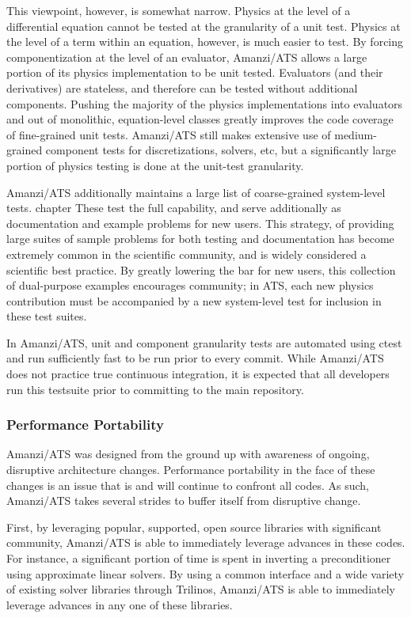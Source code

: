 This viewpoint, however, is somewhat narrow.  Physics at the level of
a differential equation cannot be tested at the granularity of a unit
test.  Physics at the level of a term within an equation, however, is
much easier to test.  By forcing componentization at the level of an
evaluator, Amanzi/ATS allows a large portion of its physics
implementation to be unit tested.  Evaluators (and their derivatives)
are stateless, and therefore can be tested without additional
components.  Pushing the majority of the physics implementations into
evaluators and out of monolithic, equation-level classes greatly
improves the code coverage of fine-grained unit tests.  Amanzi/ATS
still makes extensive use of medium-grained component tests for
discretizations, solvers, etc, but a significantly large portion of
physics testing is done at the unit-test granularity.

Amanzi/ATS additionally maintains a large list of coarse-grained
system-level tests.  %
chapter These test the full capability, and serve additionally as
documentation and example problems for new users.  This strategy, of
providing large suites of sample problems for both testing and
documentation has become extremely common in the scientific community,
and is widely considered a scientific best practice.  By greatly
lowering the bar for new users, this collection of dual-purpose
examples encourages community; in ATS, each new physics contribution
must be accompanied by a new system-level test for inclusion in these
test suites.  %

In Amanzi/ATS, unit and component granularity tests are automated
using ctest and run sufficiently fast to be run prior to every commit.
While Amanzi/ATS does not practice true continuous integration, it is
expected that all developers run this testsuite prior to committing to
the main repository.


\subsubsection{Performance Portability}
\label{sec:amanzi:performance}
%
Amanzi/ATS was designed from the ground up with awareness of ongoing,
disruptive architecture changes.  Performance portability in the face
of these changes is an issue that is and will continue to confront all
codes.  As such, Amanzi/ATS takes several strides to buffer itself
from disruptive change.

First, by leveraging popular, supported, open source libraries with
significant community, Amanzi/ATS is able to immediately leverage
advances in these codes.  For instance, a significant portion of time
is spent in inverting a preconditioner using approximate linear
solvers.  By using a common interface and a wide variety of existing
solver libraries through Trilinos, Amanzi/ATS is able to immediately
leverage advances in any one of these libraries.

